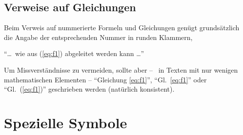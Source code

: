 \begin{comment}
\begin{equation}
\left[ \begin{array}{c}
  x' \\ y'
\end{array} \right] 
= 
\left[ \begin{array}{rr}
	 \cos \phi & \sin \phi \\
	-\sin \phi & \cos \phi
\end{array} \right] 
\cdot
\left[ \begin{array}{c}
	x \\ y
\end{array}
\right] 
.
\end{equation}
\end{comment}



\subsection{Verweise auf Gleichungen}
\label{sec:VerweiseAufGleichungen}

Beim Verweis auf nummerierte Formeln und Gleichungen genügt grundsätzlich die Angabe 
der entsprechenden Nummer in runden Klammern,
\zB\
\begin{center}
"`\ldots\ wie aus (\ref{eq:f1}) abgeleitet werden kann \ldots"'
\end{center}
Um Missverständnisse zu vermeiden, sollte aber -- \va\ in Texten mit
nur wenigen mathematischen Elementen -- "`Gleichung \ref{eq:f1}"', "`Gl.~\ref{eq:f1}"' 
oder "`Gl.~(\ref{eq:f1})"' geschrieben werden (natürlich konsistent). 

\begin{center}
\setlength{\fboxrule}{0.2mm}
\setlength{\fboxsep}{2mm}
\end{center}


\section{Spezielle Symbole}

